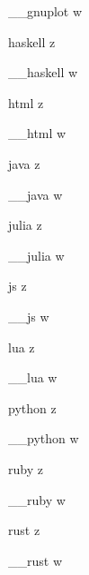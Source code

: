 \documentclass[11pt]{article}
\begin{document}
\begin{RobExtCacheMeCode}[a][b]{__gnuplot}
  w
\end{RobExtCacheMeCode}
\begin{CacheMeCode}{haskell}
z
\end{CacheMeCode}
\begin{RobExtCacheMeCode}[a][b]{__haskell}
  w
\end{RobExtCacheMeCode}
\begin{CacheMeCode}{html}
z
\end{CacheMeCode}
\begin{RobExtCacheMeCode}[a][b]{__html}
  w
\end{RobExtCacheMeCode}
\begin{CacheMeCode}{java}
z
\end{CacheMeCode}
\begin{RobExtCacheMeCode}[a][b]{__java}
  w
\end{RobExtCacheMeCode}
\begin{CacheMeCode}{julia}
z
\end{CacheMeCode}
\begin{RobExtCacheMeCode}[a][b]{__julia}
  w
\end{RobExtCacheMeCode}
\begin{CacheMeCode}{js}
z
\end{CacheMeCode}
\begin{RobExtCacheMeCode}[a][b]{__js}
  w
\end{RobExtCacheMeCode}
\begin{CacheMeCode}{lua}
z
\end{CacheMeCode}
\begin{RobExtCacheMeCode}[a][b]{__lua}
  w
\end{RobExtCacheMeCode}
\begin{CacheMeCode}{python}
z
\end{CacheMeCode}
\begin{RobExtCacheMeCode}[a][b]{__python}
  w
\end{RobExtCacheMeCode}
\begin{CacheMeCode}{ruby}
z
\end{CacheMeCode}
\begin{RobExtCacheMeCode}[a][b]{__ruby}
  w
\end{RobExtCacheMeCode}
\begin{CacheMeCode}{rust}
z
\end{CacheMeCode}
\begin{RobExtCacheMeCode}[a][b]{__rust}
  w
\end{RobExtCacheMeCode}
\end{document}
